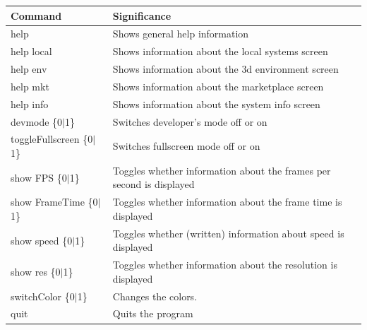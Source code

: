 \documentclass[a4paper,11pt]{article}
\begin{document}
\begin{table}[htbp]
	\centering
		\begin{tabular}{|l|l|}
		  \hline 
			Command & Significance \\
			\hline
			\hline
			help    & Shows general help information \\
			help local & Shows information about the local systems screen\\
			help env & Shows information about the 3d environment screen\\
			help mkt & Shows information about the marketplace screen \\
			help info & Shows information about the system info screen \\
			devmode \{0$\vert$1\} & Switches developer's mode off or on \\
			toggleFullscreen \{0$\vert$1\} & Switches fullscreen mode off or on \\
			show FPS \{0$\vert$1\}&
			               Toggles whether information about the frames per second is displayed \\
			show FrameTime \{0$\vert$1\} & 
			               Toggles whether information about the frame time is displayed \\
			show speed \{0$\vert$1\} & 
			               Toggles whether (written) information about speed is displayed \\
			show res \{0$\vert$1\} & Toggles whether information about the resolution is displayed \\
			switchColor \{0$\vert$1\}& Changes the colors. \\
			quit & Quits the program\\
			\hline
		\end{tabular}
\end{table}
\end{document}
